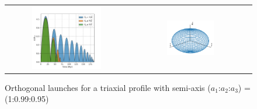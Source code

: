 \documentclass{beamer}
\begin{document}
\begin{frame}
	\begin{figure}[h]
		\begin{tabular}{cc}
			\includegraphics[width = 0.6\textwidth]{"../Files/Week 7/orthogonal_triaxial"} &
			\includegraphics[width = 0.4\textwidth]{"../Files/Week 7/ellipsoid"}
		\end{tabular}
		\caption{Orthogonal launches for a triaxial profile with semi-axis ($a_1$:$a_2$:$a_3$) = (1:0.99:0.95)}
		\label{fig: mainOrthogonalLaunches}
	\end{figure}
\end{frame}
\end{document}
